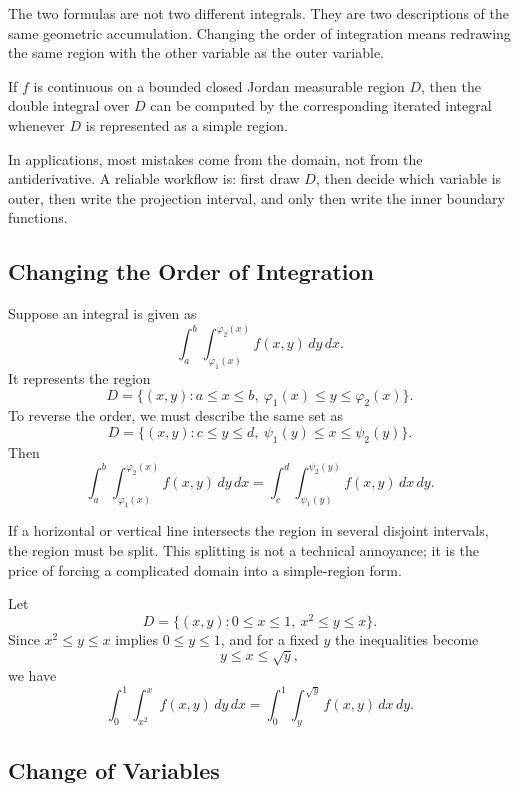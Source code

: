 The two formulas are not two different integrals. They are two descriptions of the same geometric accumulation. Changing the order of integration means redrawing the same region with the other variable as the outer variable.

\begin{theorem}
If $f$ is continuous on a bounded closed Jordan measurable region $D$, then the double integral over $D$ can be computed by the corresponding iterated integral whenever $D$ is represented as a simple region.
\end{theorem}

\begin{note}
In applications, most mistakes come from the domain, not from the antiderivative. A reliable workflow is: first draw $D$, then decide which variable is outer, then write the projection interval, and only then write the inner boundary functions.
\end{note}

\subsection{Changing the Order of Integration}

Suppose an integral is given as
\[
    \int_a^b\int_{\varphi_1(x)}^{\varphi_2(x)} f(x,y)\,dy\,dx.
\]
It represents the region
\[
    D=\{(x,y):a\le x\le b,\ \varphi_1(x)\le y\le \varphi_2(x)\}.
\]
To reverse the order, we must describe the same set as
\[
    D=\{(x,y):c\le y\le d,\ \psi_1(y)\le x\le \psi_2(y)\}.
\]
Then
\[
    \int_a^b\int_{\varphi_1(x)}^{\varphi_2(x)} f(x,y)\,dy\,dx
    =\int_c^d\int_{\psi_1(y)}^{\psi_2(y)} f(x,y)\,dx\,dy.
\]

If a horizontal or vertical line intersects the region in several disjoint intervals, the region must be split. This splitting is not a technical annoyance; it is the price of forcing a complicated domain into a simple-region form.

\begin{example}
Let
\[
    D=\{(x,y):0\le x\le 1,\ x^2\le y\le x\}.
\]
Since $x^2\le y\le x$ implies $0\le y\le 1$, and for a fixed $y$ the inequalities become
\[
    y\le x\le \sqrt{y},
\]
we have
\[
    \int_0^1\int_{x^2}^{x} f(x,y)\,dy\,dx
    =\int_0^1\int_y^{\sqrt y} f(x,y)\,dx\,dy.
\]
\end{example}

\subsection{Change of Variables}

